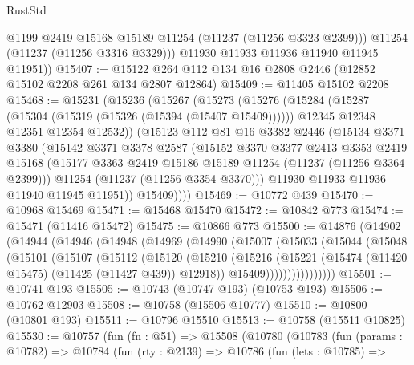 \begin{lexlean}{RustStd}
\begin{coremodule}
            @1199
            @2419
            @15168
            @15189
            @11254
            (@11237 (@11256 @3323 @2399)))
          @11254
          (@11237 (@11256 @3316 @3329)))
        @11930
        @11933
        @11936
        @11940
        @11945
        @11951))
@15407 := @15122 @264 @112 @134 @16 @2808 @2446 (@12852 @15102 @2208 @261 @134 @2807 @12864)
@15409 := @11405 @15102 @2208
@15468 := @15231
    (@15236
      (@15267
        (@15273
          (@15276
            (@15284
              (@15287 (@15304 (@15319 (@15326 (@15394 (@15407 @15409))))))
              @12345
              @12348
              @12351
              @12354
              @12532))
          (@15123
            @112
            @81
            @16
            @3382
            @2446
            (@15134
              @3371
              @3380
              (@15142
                @3371
                @3378
                @2587
                (@15152
                  @3370
                  @3377
                  @2413
                  @3353
                  @2419
                  @15168
                  (@15177 @3363 @2419 @15186 @15189 @11254 (@11237 (@11256 @3364 @2399)))
                  @11254
                  (@11237 (@11256 @3354 @3370)))
                @11930
                @11933
                @11936
                @11940
                @11945
                @11951))
            @15409))))
@15469 := @10772 @439
@15470 := @10968 @15469
@15471 := @15468 @15470
@15472 := @10842 @773
@15474 := @15471 (@11416 @15472)
@15475 := @10866 @773
@15500 := @14876
    (@14902
      (@14944
        (@14946
          (@14948
            (@14969
              (@14990
                (@15007
                  (@15033
                    (@15044
                      (@15048
                        (@15101
                          (@15107
                            (@15112
                              (@15120
                                (@15210
                                  (@15216
                                    (@15221 (@15474 (@11420 @15475) (@11425 (@11427 @439)) @12918))
                                    @15409))))))))))))))))
@15501 := @10741 @193
@15505 := @10743 (@10747 @193) (@10753 @193)
@15506 := @10762 @12903
@15508 := @10758 (@15506 @10777)
@15510 := @10800 (@10801 @193)
@15511 := @10796 @15510
@15513 := @10758 (@15511 @10825)
@15530 := @10757
    (fun (fn : @51) =>
    @15508
      (@10780
        (@10783
          (fun (params : @10782) =>
          @10784
            (fun (rty : @2139) =>
            @10786
              (fun (lets : @10785) =>

\end{coremodule}
\end{lexlean}
